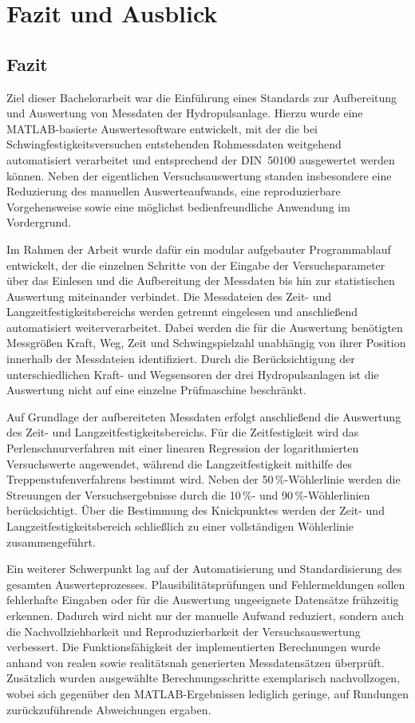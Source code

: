 \chapter{Fazit und Ausblick}
\section{Fazit}
Ziel dieser Bachelorarbeit war die Einführung eines Standards zur Aufbereitung und Auswertung von Messdaten der Hydropulsanlage. Hierzu wurde eine MATLAB-basierte Auswertesoftware entwickelt, mit der die bei Schwingfestigkeitsversuchen entstehenden Rohmessdaten weitgehend automatisiert verarbeitet und entsprechend der DIN~50100 ausgewertet werden können. Neben der eigentlichen Versuchsauswertung standen insbesondere eine Reduzierung des manuellen Auswerteaufwands, eine reproduzierbare Vorgehensweise sowie eine möglichst bedienfreundliche Anwendung im Vordergrund.

Im Rahmen der Arbeit wurde dafür ein modular aufgebauter Programmablauf entwickelt, der die einzelnen Schritte von der Eingabe der Versuchsparameter über das Einlesen und die Aufbereitung der Messdaten bis hin zur statistischen Auswertung miteinander verbindet. Die Messdateien des Zeit- und Langzeitfestigkeitsbereichs werden getrennt eingelesen und anschließend automatisiert weiterverarbeitet. Dabei werden die für die Auswertung benötigten Messgrößen Kraft, Weg, Zeit und Schwingspielzahl unabhängig von ihrer Position innerhalb der Messdateien identifiziert. Durch die Berücksichtigung der unterschiedlichen Kraft- und Wegsensoren der drei Hydropulsanlagen ist die Auswertung nicht auf eine einzelne Prüfmaschine beschränkt.

Auf Grundlage der aufbereiteten Messdaten erfolgt anschließend die Auswertung des 
Zeit- und Langzeitfestigkeitsbereichs. Für die Zeitfestigkeit wird das 
Perlenschnurverfahren mit einer linearen Regression der logarithmierten Versuchswerte 
angewendet, während die Langzeitfestigkeit mithilfe des Treppenstufenverfahrens 
bestimmt wird. Neben der 50\,\%-Wöhlerlinie werden die Streuungen der Versuchsergebnisse 
durch die 10\,\%- und 90\,\%-Wöhlerlinien berücksichtigt. Über die Bestimmung des 
Knickpunktes werden der Zeit- und Langzeitfestigkeitsbereich schließlich zu einer 
vollständigen Wöhlerlinie zusammengeführt.

Ein weiterer Schwerpunkt lag auf der Automatisierung und Standardisierung des gesamten 
Auswerteprozesses. Plausibilitätsprüfungen und Fehlermeldungen sollen fehlerhafte 
Eingaben oder für die Auswertung ungeeignete Datensätze frühzeitig erkennen. Dadurch 
wird nicht nur der manuelle Aufwand reduziert, sondern auch die Nachvollziehbarkeit 
und Reproduzierbarkeit der Versuchsauswertung verbessert. Die Funktionsfähigkeit der 
implementierten Berechnungen wurde anhand von realen sowie realitätsnah generierten 
Messdatensätzen überprüft. Zusätzlich wurden ausgewählte Berechnungsschritte 
exemplarisch nachvollzogen, wobei sich gegenüber den MATLAB-Ergebnissen lediglich 
geringe, auf Rundungen zurückzuführende Abweichungen ergaben.

